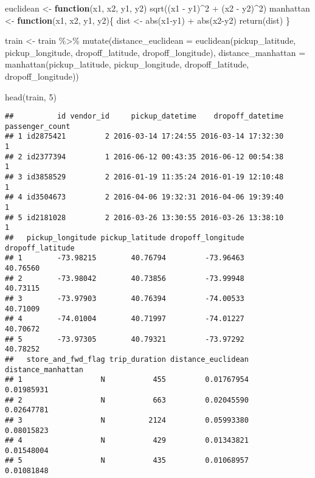 \documentclass[
]{article}
\newenvironment{Shaded}{\begin{snugshade}}{\end{snugshade}}
\newcommand{\AttributeTok}[1]{\textcolor[rgb]{0.77,0.63,0.00}{#1}}
\newcommand{\ControlFlowTok}[1]{\textcolor[rgb]{0.13,0.29,0.53}{\textbf{#1}}}
\newcommand{\DecValTok}[1]{\textcolor[rgb]{0.00,0.00,0.81}{#1}}
\newcommand{\FunctionTok}[1]{\textcolor[rgb]{0.00,0.00,0.00}{#1}}
\newcommand{\NormalTok}[1]{#1}
\newcommand{\OtherTok}[1]{\textcolor[rgb]{0.56,0.35,0.01}{#1}}
\newcommand{\SpecialCharTok}[1]{\textcolor[rgb]{0.00,0.00,0.00}{#1}}
\begin{document}
\begin{Shaded}
\begin{Highlighting}[]
\NormalTok{euclidean }\OtherTok{\textless{}{-}} \ControlFlowTok{function}\NormalTok{(x1, x2, y1, y2) }\FunctionTok{sqrt}\NormalTok{((x1 }\SpecialCharTok{{-}}\NormalTok{ y1)}\SpecialCharTok{\^{}}\DecValTok{2} \SpecialCharTok{+}\NormalTok{ (x2 }\SpecialCharTok{{-}}\NormalTok{ y2)}\SpecialCharTok{\^{}}\DecValTok{2}\NormalTok{)}
\NormalTok{manhattan }\OtherTok{\textless{}{-}} \ControlFlowTok{function}\NormalTok{(x1, x2, y1, y2)\{}
\NormalTok{    dist }\OtherTok{\textless{}{-}} \FunctionTok{abs}\NormalTok{(x1}\SpecialCharTok{{-}}\NormalTok{y1) }\SpecialCharTok{+} \FunctionTok{abs}\NormalTok{(x2}\SpecialCharTok{{-}}\NormalTok{y2)}
    \FunctionTok{return}\NormalTok{(dist)}
\NormalTok{\}}

\NormalTok{train }\OtherTok{\textless{}{-}}\NormalTok{ train }\SpecialCharTok{\%\textgreater{}\%} \FunctionTok{mutate}\NormalTok{(}\AttributeTok{distance\_euclidean =} \FunctionTok{euclidean}\NormalTok{(pickup\_latitude, pickup\_longitude, dropoff\_latitude, dropoff\_longitude),}
                                          \AttributeTok{distance\_manhattan =} \FunctionTok{manhattan}\NormalTok{(pickup\_latitude, pickup\_longitude, dropoff\_latitude, dropoff\_longitude))}


\FunctionTok{head}\NormalTok{(train, }\DecValTok{5}\NormalTok{)}
\end{Highlighting}
\end{Shaded}

\begin{verbatim}
##          id vendor_id     pickup_datetime    dropoff_datetime passenger_count
## 1 id2875421         2 2016-03-14 17:24:55 2016-03-14 17:32:30               1
## 2 id2377394         1 2016-06-12 00:43:35 2016-06-12 00:54:38               1
## 3 id3858529         2 2016-01-19 11:35:24 2016-01-19 12:10:48               1
## 4 id3504673         2 2016-04-06 19:32:31 2016-04-06 19:39:40               1
## 5 id2181028         2 2016-03-26 13:30:55 2016-03-26 13:38:10               1
##   pickup_longitude pickup_latitude dropoff_longitude dropoff_latitude
## 1        -73.98215        40.76794         -73.96463         40.76560
## 2        -73.98042        40.73856         -73.99948         40.73115
## 3        -73.97903        40.76394         -74.00533         40.71009
## 4        -74.01004        40.71997         -74.01227         40.70672
## 5        -73.97305        40.79321         -73.97292         40.78252
##   store_and_fwd_flag trip_duration distance_euclidean distance_manhattan
## 1                  N           455         0.01767954         0.01985931
## 2                  N           663         0.02045590         0.02647781
## 3                  N          2124         0.05993380         0.08015823
## 4                  N           429         0.01343821         0.01548004
## 5                  N           435         0.01068957         0.01081848
\end{verbatim}
\end{document}
